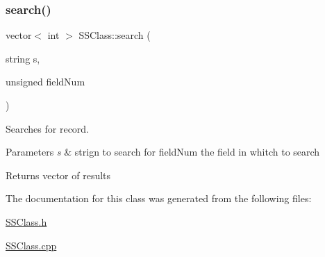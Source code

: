 \subsubsection{\texorpdfstring{search()}{search()}}
{\footnotesize\ttfamily vector$<$ int $>$ S\+S\+Class\+::search (\begin{DoxyParamCaption}\item[{string}]{s,  }\item[{unsigned}]{field\+Num }\end{DoxyParamCaption})}



Searches for record. 


\begin{DoxyParams}{Parameters}
{\em s} & strign to search for  field\+Num the field in whitch to search \\
\hline
\end{DoxyParams}
\begin{DoxyReturn}{Returns}
vector of results 
\end{DoxyReturn}


The documentation for this class was generated from the following files\+:\begin{DoxyCompactItemize}
\item 
\hyperlink{SSClass_8h}{S\+S\+Class.\+h}\item 
\hyperlink{SSClass_8cpp}{S\+S\+Class.\+cpp}\end{DoxyCompactItemize}
